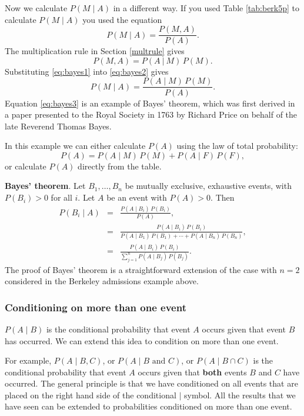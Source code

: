 \documentclass[
  british,
  11pt,
  openany, a4paper]{book}
\begin{document}
Now we calculate \(P(M \mid A)\) in a different way. If you used Table \ref{tab:berk5p} to calculate \(P(M \mid A)\) you used the equation
\begin{equation}
P(M \mid A) = \frac{P(M , A)}{P(A)}. 
\label{eq:bayes1}
\end{equation}
The multiplication rule in Section \ref{multrule} gives
\begin{equation}
P(M , A) = P(A~|~M)\,P(M). 
\label{eq:bayes2}
\end{equation}
Substituting \eqref{eq:bayes1} into \eqref{eq:bayes2} gives
\begin{equation}
P(M \mid A) = \frac{P(A \mid M)\,P(M)}{P(A)}. 
\label{eq:bayes3}
\end{equation}
Equation \eqref{eq:bayes3} is an example of Bayes' theorem, which was first derived in a paper presented to the Royal Society in 1763 by Richard Price on behalf of the late Reverend Thomas Bayes.

In this example we can either calculate \(P(A)\) using the law of total probability:
\[ P(A) = P(A \mid M)\,P(M) + P(A \mid F)\,P(F), \]
or calculate \(P(A)\) directly from the table.

\textbf{Bayes' theorem}. Let \(B_1, \ldots, B_n\) be mutually exclusive, exhaustive events, with \(P(B_i) > 0\) for all \(i\). Let \(A\) be an event with \(P(A) > 0\). Then
\begin{eqnarray*}
P(B_i \mid A) &=& \frac{P(A \mid B_i)\,P(B_i)}{P(A)}, \\ 
&=& \frac{P(A \mid B_i)\,P(B_i)}{P(A \mid B_1)\,P(B_1) + \cdots + P(A \mid B_n)\,P(B_n)}, \\
          &=& \frac{P(A \mid B_i)\,P(B_i)}{\displaystyle\sum_{j=1}^n P(A \mid B_j)\,P(B_j)}.
\end{eqnarray*}
The proof of Bayes' theorem is a straightforward extension of the case with \(n=2\) considered in the Berkeley admissions example above.

\subsubsection*{Conditioning on more than one event}\label{conditioning-on-more-than-one-event}

\(P(A \mid B)\) is the conditional probability that event \(A\) occurs given that event \(B\) has occurred. We can extend this idea to condition on more than one event.

For example, \(P(A \mid B , C)\), or \(P(A \mid B \text{ and } C)\), or \(P(A \mid B \cap C)\) is the conditional probability that event \(A\) occurs given that \textbf{both} events \(B\) and \(C\) have occurred. The general principle is that we have conditioned on all events that are placed on the right hand side of the conditional \(\mid\) symbol. All the results that we have seen can be extended to probabilities conditioned on more than one event.
\end{document}
